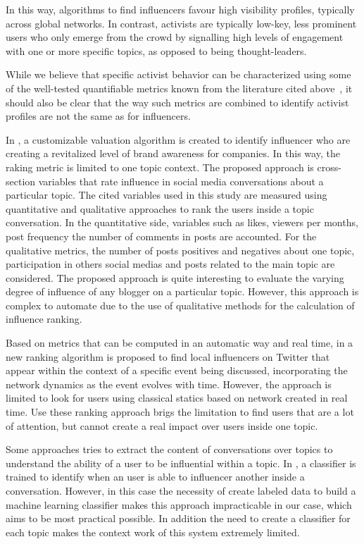 \documentclass[runningheads]{llncs}
\begin{document}
In this way, algorithms to find influencers favour high visibility profiles, typically across global networks. In contrast, activists are typically low-key, less prominent users who only emerge from the crowd by signalling high levels of engagement with one or more specific topics, as opposed to being thought-leaders. 

While we believe that specific activist behavior can be characterized using some of the well-tested quantifiable metrics known from the literature cited above~\cite{RIQUELME2016949}, it should also be clear that the way such metrics are combined to identify activist profiles are not the same as for influencers. 

In \cite{MATIC2011}, a customizable valuation algorithm is created to identify influencer who are creating a revitalized level of brand awareness for companies. In this way, the raking metric is limited to one topic context. The proposed approach is cross-section variables that rate influence in social media conversations about a particular topic. The cited variables used in this study are measured using quantitative and qualitative approaches to rank the users inside a topic conversation. In the quantitative side, variables such as likes, viewers per months, post frequency the number of comments in posts are accounted. For the qualitative metrics, the number of posts positives and negatives about one topic, participation in others social medias and posts related to the main topic are considered.  The proposed approach is quite interesting to evaluate the varying degree of influence of any blogger on a particular topic. However, this approach is complex to automate due to the use of qualitative methods for the calculation of influence ranking.

Based on metrics that can be computed in an automatic way and real time, in \cite{Kardara2015} a new ranking algorithm is proposed to find local influencers on Twitter that appear within the context of a specific event being discussed, incorporating the network dynamics as the event evolves with time. However, the approach is limited to look for users using classical statics based on network created in real time. Use these ranking approach brigs the limitation to find users that are a lot of attention, but cannot create a real impact over users inside one topic.

Some approaches tries to extract the content of conversations over topics to understand the ability of a user to be influential within a topic. In \cite{Biran2012}, a classifier is trained to identify when an user is able to influencer another inside a conversation. However, in this case the necessity of create labeled data to build a machine learning classifier makes this approach impracticable in our case, which aims to be most practical possible. In addition the need to create a classifier for each topic makes the context work of this system extremely limited.
\end{document}

